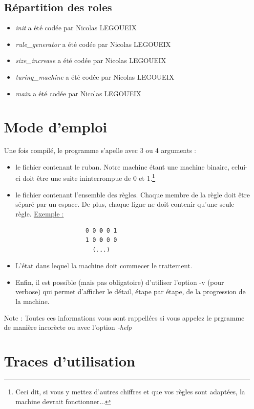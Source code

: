 \documentclass[12pt,a4paper]{report}
\begin{document}
\section{Répartition des roles}
\begin{itemize}
\item \textit{init} a été codée par Nicolas LEGOUEIX
\item \textit{rule\_generator} a été codée par Nicolas LEGOUEIX
\item \textit{size\_increase} a été codée par Nicolas LEGOUEIX
\item \textit{turing\_machine} a été codée par Nicolas LEGOUEIX
\item \textit{main} a été codée par Nicolas LEGOUEIX
\end{itemize}
\chapter{Mode d'emploi}
Une fois compilé, le programme s'apelle avec 3 ou 4 arguments :
\begin{itemize}
\item le fichier contenant le ruban. Notre machine étant une machine binaire, celui-ci doit être une suite ininterrompue de 0 et 1.\footnote{Ceci dit, si vous y mettez d'autres chiffres et que vos règles sont adaptées, la machine devrait fonctionner...}
\item le fichier contenant l'ensemble des règles. Chaque membre de la règle doit être séparé par un espace. De plus, chaque ligne ne doit contenir qu'une seule règle.
\underline{Exemple :}
\begin{center}
\begin{lstlisting}
                    0 0 0 0 1
                    1 0 0 0 0
                      (...)
\end{lstlisting}
\end{center}
\item L'état dans lequel la machine doit commecer le traitement.
\label{chap:emploi}
\item Enfin, il est possible (mais pas obligatoire) d'utiliser l'option -v (pour verbose) qui permet d'afficher le détail, étape par étape, de la progression de la machine.
\end{itemize}
Note : Toutes ces informations vous sont rappellées si vous appelez le prgramme de manière incorècte ou avec l'option \textit{-help}
\chapter{Traces d'utilisation}
\end{document}
